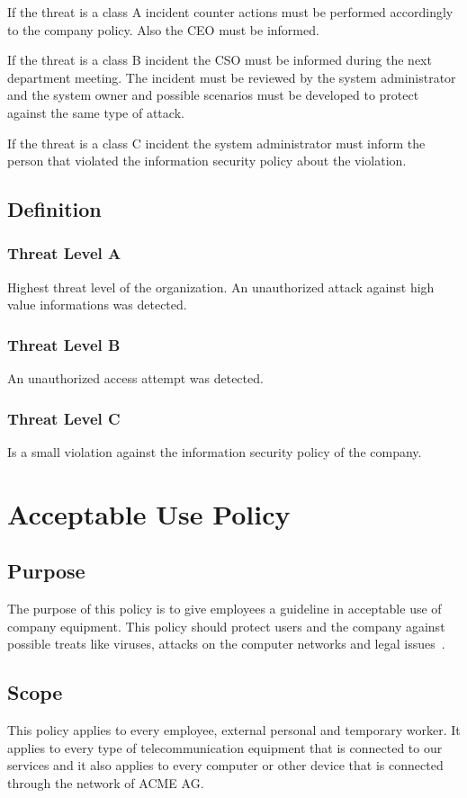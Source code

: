 If the threat is a class A incident counter actions must be performed accordingly to the company policy. Also the CEO must be informed.

If the threat is a class B incident the CSO must be informed during the next department meeting.  The incident must be reviewed by the system administrator and the system owner and possible scenarios must be developed to protect against the same type of attack. 

If the threat is a class C incident the system administrator must inform the person that violated the information security policy about the violation.   
\section{Definition}
\subsection{Threat Level A}
Highest threat level of the organization. An unauthorized attack against high value informations was detected.  
\subsection{Threat Level B} 
An unauthorized access attempt was detected. 
\subsection{Threat Level C}
Is a small violation against the information security policy of the company.  
\chapter{Acceptable Use Policy}
\section{Purpose}
The purpose of this policy is to give employees a guideline in acceptable use of company equipment. This policy should protect users and the company against possible treats like viruses,  attacks on the computer networks and legal issues~\cite{Sans}.
\section{Scope}
This policy applies to every employee, external personal and temporary worker. It applies to every type of telecommunication equipment that is connected to our services and it also applies to every computer or other device that is connected through the network of ACME AG.  
